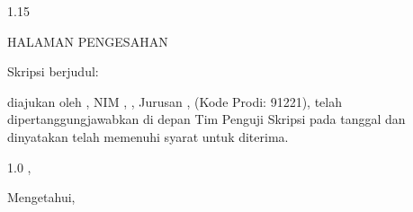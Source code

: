 \newpage
{}
{}
\begin{spacing}{1.15}
\begin{center}
    HALAMAN PENGESAHAN\par
    \vspace{0.3cm}
\end{center}
\noindent Skripsi berjudul:\par
\begin{center}
    \textbf{\thesistitle}\par
\end{center}
\noindent diajukan oleh \researchername{}, NIM \researchernim, \programstudy, Jurusan \departmentname, \facultyname{} \institutionname{} (Kode Prodi: 91221), telah dipertanggungjawabkan di depan Tim Penguji Skripsi pada tanggal \makebox[4cm]{\dotfill} dan dinyatakan telah memenuhi syarat untuk diterima.\par
\vspace{0.3cm}
\begin{spacing}{1.0}
\noindent\hspace{0.25\textwidth}\cityname, \makebox[4cm]{\dotfill}\par
\vspace{0.2cm}
\centerline{Mengetahui,}
\vspace{0.2cm}
\noindent
{}%
\hfill
{}\par
\end{spacing}
\end{spacing}
